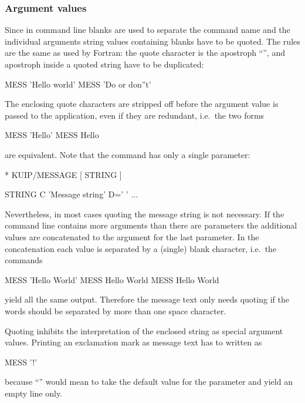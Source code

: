 %
%
\subsubsection{Argument values}

Since in command line blanks are used to separate the command name and
the individual arguments string values containing blanks have to be
quoted.
The rules are the same as used by Fortran:
the quote character is the apostroph ``'', and apostroph
inside a quoted string have to be duplicated:
\begin{XMP}
MESS 'Hello world'
MESS 'Do or don''t'
\end{XMP}

The enclosing quote characters are stripped off before the argument
value is passed to the application, even if they are redundant, i.e.\
the two forms
\begin{XMP}
MESS 'Hello'
MESS Hello
\end{XMP}
are equivalent.
Note that the  command has only a single parameter:
\begin{XMP}
 * KUIP/MESSAGE [ STRING ]

   STRING     C 'Message string' D=' '
...
\end{XMP}
Nevertheless, in most cases quoting the message string is not
necessary.
If the command line contains more arguments than there are parameters
the additional values are concatenated to the argument for the
last parameter.
In the concatenation each value is separated by a (single) blank
character, i.e.\ the commands
\begin{XMP}
MESS 'Hello World'
MESS  Hello World
MESS  Hello       World
\end{XMP}
yield all the same output.
Therefore the message text only needs quoting if the words should be
separated by more than one space character.

Quoting inhibits the interpretation of the enclosed string as
special argument values.
Printing an exclamation mark as message text has to
written as
\begin{XMP}
MESS '!'
\end{XMP}
because ``'' would mean to take the default value for
the parameter \Pind{STRING} and yield an empty line only.

